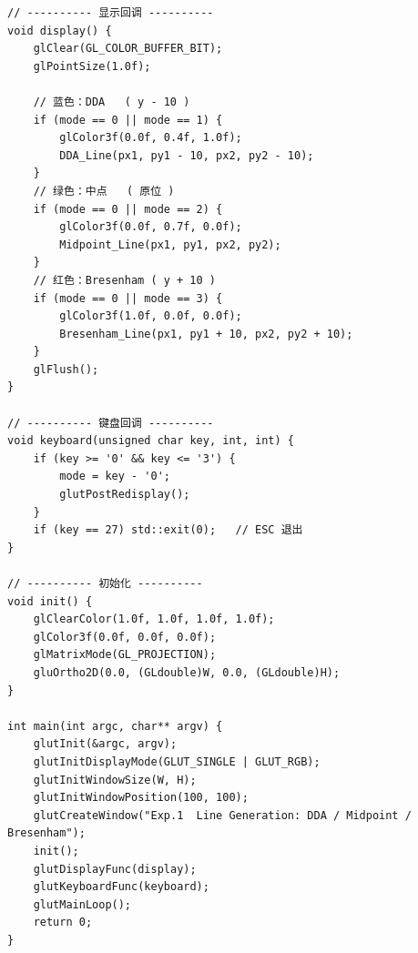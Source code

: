 \documentclass[a4paper,12pt]{ctexart}
\begin{document}
\begin{lstlisting}[style=cppstyle,caption={直线生成算法对比 —— 完整源代码}]
// ---------- 显示回调 ----------
void display() {
    glClear(GL_COLOR_BUFFER_BIT);
    glPointSize(1.0f);

    // 蓝色：DDA   ( y - 10 )
    if (mode == 0 || mode == 1) {
        glColor3f(0.0f, 0.4f, 1.0f);
        DDA_Line(px1, py1 - 10, px2, py2 - 10);
    }
    // 绿色：中点   ( 原位 )
    if (mode == 0 || mode == 2) {
        glColor3f(0.0f, 0.7f, 0.0f);
        Midpoint_Line(px1, py1, px2, py2);
    }
    // 红色：Bresenham ( y + 10 )
    if (mode == 0 || mode == 3) {
        glColor3f(1.0f, 0.0f, 0.0f);
        Bresenham_Line(px1, py1 + 10, px2, py2 + 10);
    }
    glFlush();
}

// ---------- 键盘回调 ----------
void keyboard(unsigned char key, int, int) {
    if (key >= '0' && key <= '3') {
        mode = key - '0';
        glutPostRedisplay();
    }
    if (key == 27) std::exit(0);   // ESC 退出
}

// ---------- 初始化 ----------
void init() {
    glClearColor(1.0f, 1.0f, 1.0f, 1.0f);
    glColor3f(0.0f, 0.0f, 0.0f);
    glMatrixMode(GL_PROJECTION);
    gluOrtho2D(0.0, (GLdouble)W, 0.0, (GLdouble)H);
}

int main(int argc, char** argv) {
    glutInit(&argc, argv);
    glutInitDisplayMode(GLUT_SINGLE | GLUT_RGB);
    glutInitWindowSize(W, H);
    glutInitWindowPosition(100, 100);
    glutCreateWindow("Exp.1  Line Generation: DDA / Midpoint / Bresenham");
    init();
    glutDisplayFunc(display);
    glutKeyboardFunc(keyboard);
    glutMainLoop();
    return 0;
}
\end{lstlisting}
\end{document}
